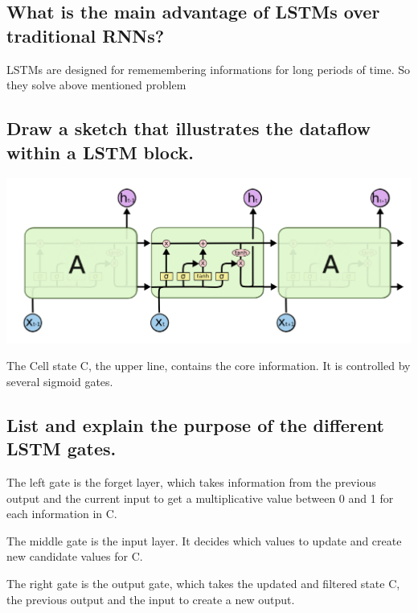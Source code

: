 \subsection{What is the main advantage of LSTMs over traditional RNNs?}
LSTMs are designed for rememembering informations for long periods of time. So they solve above mentioned problem
\subsection{Draw a sketch that illustrates the dataflow within a LSTM block.}
\begin{minipage}{\textwidth}
\includegraphics[width=\textwidth]{./img/lstm.png}
\end{minipage}
The Cell state C, the upper line, contains the core information. It is controlled by several
sigmoid gates. 
\subsection{List and explain the purpose of the different LSTM gates.}
The left gate is the forget layer, which takes information from the previous output and the current input to get a multiplicative value between 0 and 1 for each information in C.

The middle gate is the input layer. It decides which values to update and create new candidate values for C.

The right gate is the output gate, which takes the updated and filtered state C, the previous output and the input to create a new output.

\addtocounter{section}{-1}\section{}\label{sec:done}